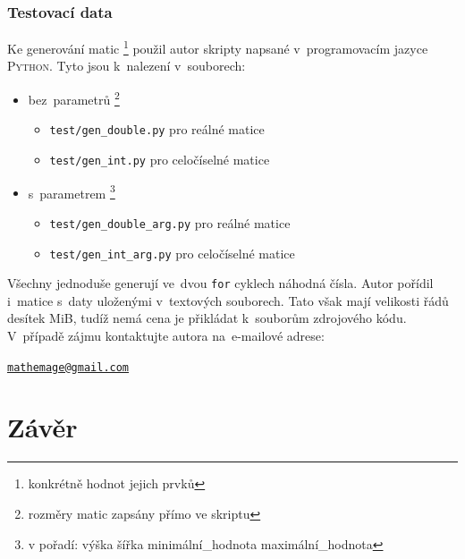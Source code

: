 \documentclass[11pt,a4paper]{article}
\theoremstyle{remark}
\begin{document}
\section{Testovací data}

Ke generování matic\thinspace%
\footnote{konkrétně hodnot jejich prvků}
použil autor skripty napsané v~programovacím jazyce \textsc{Python}.
Tyto jsou k~nalezení v~souborech:
\begin{itemize}
  \item bez~parametrů\thinspace%
    \footnote{rozměry matic zapsány přímo ve skriptu}
  \begin{itemize}
    \item \verb=test/gen_double.py= pro reálné matice
    \item \verb=test/gen_int.py= pro celočíselné matice
  \end{itemize}
  \item s~parametrem\thinspace%
    \footnote{v pořadí: výška šířka minimální\_hodnota maximální\_hodnota}
    \begin{itemize}
      \item \verb=test/gen_double_arg.py= pro reálné matice
      \item \verb=test/gen_int_arg.py= pro celočíselné matice
    \end{itemize}
\end{itemize}
Všechny jednoduše generují ve~dvou \verb=for= cyklech náhodná čísla.
Autor pořídil i~matice s~daty uloženými v~textových souborech.
Tato však mají velikosti řádů desítek MiB, tudíž nemá cena je přikládat
k~souborům zdrojového kódu.
V~případě zájmu kontaktujte autora na~e-mailové adrese: 

\begin{center}
\href{mailto:mathemage@gmail.com}{\nolinkurl{mathemage@gmail.com}}
\end{center}

\pagebreak

\part{Závěr}
\end{document}
